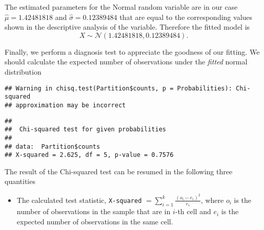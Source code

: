 \documentclass[
]{article}
\newenvironment{Shaded}{\begin{snugshade}}{\end{snugshade}}
\newcommand{\AttributeTok}[1]{\textcolor[rgb]{0.13,0.29,0.53}{#1}}
\newcommand{\ConstantTok}[1]{\textcolor[rgb]{0.56,0.35,0.01}{#1}}
\newcommand{\DecValTok}[1]{\textcolor[rgb]{0.00,0.00,0.81}{#1}}
\newcommand{\FunctionTok}[1]{\textcolor[rgb]{0.13,0.29,0.53}{\textbf{#1}}}
\newcommand{\NormalTok}[1]{#1}
\newcommand{\OtherTok}[1]{\textcolor[rgb]{0.56,0.35,0.01}{#1}}
\newcommand{\SpecialCharTok}[1]{\textcolor[rgb]{0.81,0.36,0.00}{\textbf{#1}}}
\providecommand{\tightlist}{%
  \setlength{\itemsep}{0pt}\setlength{\parskip}{0pt}}
\begin{document}
The estimated parameters for the Normal random variable are in our case
\(\widehat{\mu} = 1.42481818\) and \(\widehat{\sigma} = 0.12389484\)
that are equal to the corresponding values shown in the descriptive
analysis of the variable. Therefore the fitted model is
\[X \sim \mathcal{N}(1.42481818, 0.12389484).\]

Finally, we perform a diagnosis test to appreciate the goodness of our
fitting. We should calculate the expected number of observations under
the \emph{fitted} normal distribution

\begin{Shaded}
\end{Shaded}

\begin{verbatim}
## Warning in chisq.test(Partition$counts, p = Probabilities): Chi-squared
## approximation may be incorrect
\end{verbatim}

\begin{verbatim}
## 
##  Chi-squared test for given probabilities
## 
## data:  Partition$counts
## X-squared = 2.625, df = 5, p-value = 0.7576
\end{verbatim}

The result of the Chi-squared test can be resumed in the following three
quantities

\begin{itemize}
\tightlist
\item
  The calculated test statistic, \texttt{X-squared}
  \(= \sum_{i=1}^{k} \frac{(o_i-e_i)^2}{e_i}\), where \(o_i\) is the
  number of observations in the sample that are in \(i\)-th cell and
  \(e_i\) is the expected number of observations in the same cell.
\end{itemize}
\end{document}
